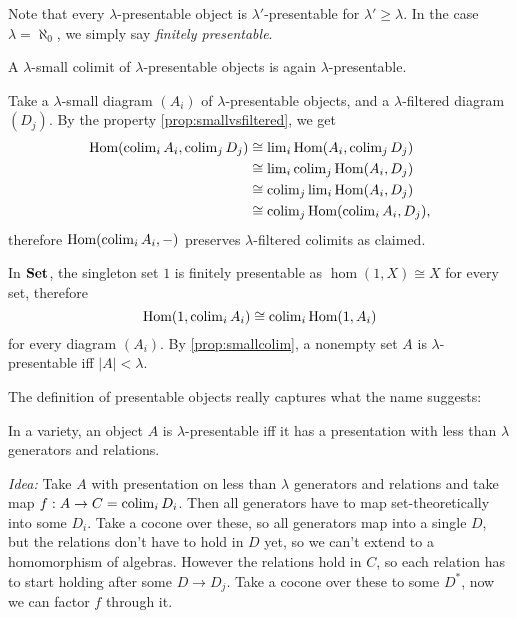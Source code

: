 Note that every $\lambda$-presentable object is $\lambda'$-presentable for $\lambda' \geq \lambda$. In the case $\lambda=\aleph_0$, we simply say \emph{finitely presentable}. \\

\begin{Lemma}\label{prop:smallcolim} A $\lambda$-small colimit of $\lambda$-presentable objects is again $\lambda$-presentable.
\end{Lemma}
\begin{Proof}
Take a $\lambda$-small diagram $(A_i)$ of $\lambda$-presentable objects, and a $\lambda$-filtered diagram $(D_j)$. By the property \ref{prop:smallvsfiltered}, we get
\begin{align*}
\textrm{Hom}(\operatorname{colim}_i A_i, \operatorname{colim}_j D_j) &\cong \operatorname{lim}_i \textrm{Hom}(A_i, \operatorname{colim}_j D_j) \\
&\cong \operatorname{lim}_i \operatorname{colim}_j \textrm{Hom}(A_i, D_j) \\
&\cong \operatorname{colim}_j \operatorname{lim}_i \textrm{Hom}(A_i, D_j) \\
&\cong \operatorname{colim}_j \textrm{Hom}(\operatorname{colim}_i A_i, D_j),
\end{align*}
therefore $\textrm{Hom}(\operatorname{colim}_i A_i, -)$ preserves $\lambda$-filtered colimits as claimed.
\end{Proof}

\begin{Example}
In $\mathbf{Set}$, the singleton set $1$ is finitely presentable as $\hom(1,X) \cong X$ for every set, therefore
\[ \textrm{Hom}(1,\operatorname{colim}_i A_i) \cong \operatorname{colim}_i \textrm{Hom}(1,A_i) \]
for every diagram $(A_i)$. By \ref{prop:smallcolim}, a nonempty set $A$ is $\lambda$-presentable iff $|A| < \lambda$.
\end{Example}

The definition of presentable objects really captures what the name suggests: 

\begin{Proposition}\label{prop:varietypresentable} In a variety, an object $A$ is $\lambda$-presentable iff it has a presentation with less than $\lambda$ generators and relations.
\end{Proposition}
\textit{Idea: } Take $A$ with presentation on less than $\lambda$ generators and relations and take map $f : A \to C = \operatorname{colim}_i D_i$. Then all generators have to map set-theoretically into some $D_i$. Take a cocone over these, so all generators map into a single $D$, but the relations don't have to hold in $D$ yet, so we can't extend to a homomorphism of algebras. However the relations hold in $C$, so each relation has to start holding after some $D \to D_j$. Take a cocone over these to some $D^*$, now we can factor $f$ through it. \\

